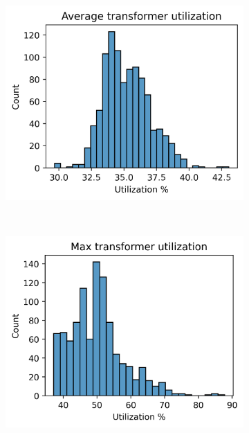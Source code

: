 \begin{figure}[H]
\begin{subfigure}{.33\textwidth}
      \caption{}
      \label{fig:result:suburban:histograms:max_cable}
    \end{subfigure}
    \begin{subfigure}{.33\textwidth}
        \centering
        \includegraphics[width=\linewidth]{img/switchstate_exploring/swiss_suburb/histograms/avg_trafo_util.png}
        \caption{}
        \label{fig:result:suburban:histograms:avg_trafo}
      \end{subfigure}\\
      \begin{subfigure}{.33\textwidth}
        \centering
        \includegraphics[width=\linewidth]{img/switchstate_exploring/swiss_suburb/histograms/max_trafo_util.png}

\end{subfigure}
\end{figure}

